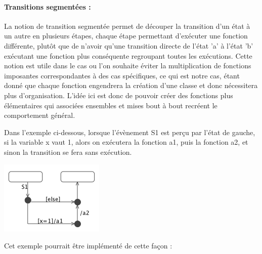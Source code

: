 \documentclass[french, 12pt, a4paper]{article}
\begin{document}
        
        \paragraph{Transitions segmentées : }
        La notion de transition segmentée permet de découper la transition d'un état à un autre en plusieurs étapes, chaque étape permettant d'exécuter une fonction différente, plutôt que de n'avoir qu'une transition directe de l'état 'a' à l'état 'b' exécutant une fonction plus conséquente regroupant toutes les exécutions. Cette notion est utile dans le cas ou l'on souhaite éviter la multiplication de fonctions imposantes correspondantes à des cas spécifiques, ce qui est notre cas, étant donné que chaque fonction engendrera la création d'une classe et donc nécessitera plus d'organisation. L'idée ici est donc de pouvoir créer des fonctions plus élémentaires qui associées ensembles et mises bout à bout recréent le comportement général.
        
        \bigskip
        
        Dans l'exemple ci-dessous, lorsque l'évènement S1 est perçu par l'état de gauche, si la variable x vaut 1, alors on exécutera la fonction a1, puis la fonction a2, et sinon la transition se fera sans exécution.
        
         \begin{center}
			\captionsetup{type=figure}
			\includegraphics[scale=1]{Images/segmented_transition.png}
	    \end{center}
        
        Cet exemple pourrait être implémenté de cette façon :
        
\end{document}
